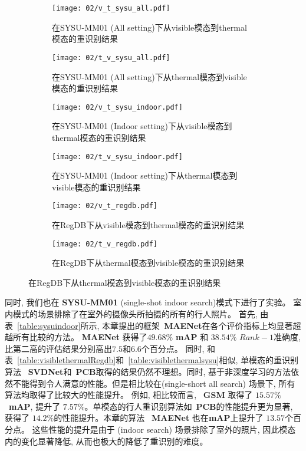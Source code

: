 \begin{figure}[!htp]
  \centering
  \begin{subfigure}{0.45\textwidth}
    \centering
    \texttt{[image: 02/v\_t\_sysu\_all.pdf]}
    \caption{在SYSU-MM01 (All setting)下从visible模态到thermal模态的重识别结果}
  \end{subfigure}
  \hspace{1cm}
  \begin{subfigure}{0.45\textwidth}
    \centering
    \texttt{[image: 02/t\_v\_sysu\_all.pdf]}
    \caption{在SYSU-MM01 (All setting)下从thermal模态到visible模态的重识别结果}
  \end{subfigure}
  \begin{subfigure}{0.45\textwidth}
    \centering
    \texttt{[image: 02/v\_t\_sysu\_indoor.pdf]}
    \caption{在SYSU-MM01 (Indoor setting)下从visible模态到thermal模态的重识别结果}
  \end{subfigure}
  \hspace{1cm}
  \begin{subfigure}{0.45\textwidth}
    \centering
    \texttt{[image: 02/t\_v\_sysu\_indoor.pdf]}
    \caption{在SYSU-MM01 (Indoor setting)下从thermal模态到visible模态的重识别结果}
  \end{subfigure}
  \begin{subfigure}{0.45\textwidth}
    \centering
    \texttt{[image: 02/v\_t\_regdb.pdf]}
    \caption{在RegDB下从visible模态到thermal模态的重识别结果}
  \end{subfigure}
  \hspace{1cm}
  \begin{subfigure}{0.45\textwidth}
    \centering
    \texttt{[image: 02/t\_v\_regdb.pdf]}
    \caption{在RegDB下从thermal模态到visible模态的重识别结果}
  \end{subfigure}
  \label{fig:ablation_res}
\end{figure}

同时, 我们也在 \textbf{SYSU-MM01} (single-shot indoor search)模式下进行了实验。 室内模式的场景排除了在室外的摄像头所拍摄的所有的行人照片。 首先, 由表~\ref{table:sysuindoor}所示, 本章提出的框架~\textbf{MAENet}在各个评价指标上均显著超越所有比较的方法。 \textbf{MAENet} 获得了$49.68 \%$ \textbf{mAP} 和 $38.54 \%$ $Rank-1$准确度, 比第二高的评估结果分别高出$7.5$和$6.6$个百分点。 同时, 和表~\ref{table:visiblethermalRegdb}和~\ref{table:visiblethermalsysu}相似, 单模态的重识别算法 ~\textbf{SVDNet}和~\textbf{PCB}取得的结果仍然不理想。同时, 基于非深度学习的方法依然不能得到令人满意的性能。但是相比较在(single-short all search) 场景下, 所有算法均取得了比较大的性能提升。 例如, 相比较而言, ~\textbf{GSM} 取得了 $15.57 \%$ ~\textbf{mAP}, 提升了 $7.57 \%$。单模态的行人重识别算法如~\textbf{PCB}的性能提升更为显著, 获得了 $14.2 \%$的性能提升。本章的算法 ~\textbf{MAENet} 也在\textbf{mAP}上提升了 $13.57$个百分点。 这些性能的提升是由于 (indoor search) 场景排除了室外的照片, 因此模态内的变化显著降低, 从而也极大的降低了重识别的难度。
